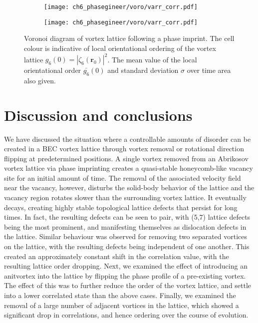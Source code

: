 \begin{figure}\ContinuedFloat\centering
    \begin{subfigure}{0.6\textwidth}
        \texttt{[image: ch6\_phasegineer/voro/varr\_corr.pdf]}
    \end{subfigure}
    \begin{subfigure}{0.6\textwidth}
        \texttt{[image: ch6\_phasegineer/voro/varr\_corr.pdf]}
    \end{subfigure}
    \caption{Voronoi diagram of vortex lattice following a phase imprint. The cell colour is indicative of local orientational ordering of the vortex lattice $g_6(0) = |\zeta_6(\mathbf{r}_0)|^2$. The mean value of the local orientational order $\bar{g_6}(0)$ and standard deviation $\sigma$ over time area also given.}
\end{figure}

\section{Discussion and conclusions}\label{sec:ch6_conc}

We have discussed the situation where a controllable amounts of disorder can be created in a BEC vortex lattice through vortex removal or rotational direction flipping at predetermined positions. A single vortex removed from an Abrikosov vortex lattice via phase imprinting creates a quasi-stable honeycomb-like vacancy site for an initial amount of time. The removal of the associated velocity field near the vacancy, however, disturbs the solid-body behavior of the lattice and the vacancy region rotates slower than the surrounding vortex lattice. It eventually decays, creating highly stable topological lattice defects that persist for long times. In fact, the resulting defects can be seen to pair, with (5,7) lattice defects being the most prominent, and manifesting themselves as dislocation defects in the lattice. Similar behaviour was observed for removing two separated vortices on the lattice, with the resulting defects being independent of one another. This created an approximately constant shift in the correlation value, with the resulting lattice order dropping. Next, we examined the effect of introducing an anitvortex into the lattice by flipping the phase profile of a pre-existing vortex. The effect of this was to further reduce the order of the vortex lattice, and settle into a lower correlated state than the above cases. Finally, we examined the removal of a large number of adjacent vortices in the lattice, which showed a significant drop in correlations, and hence ordering over the course of evolution.


